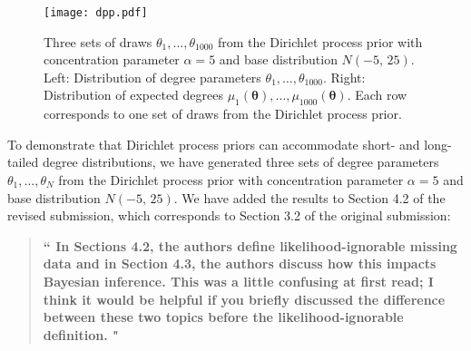 \documentclass[12pt]{article}
\renewcommand{\btheta}{\bm{\theta}}
\renewcommand{\=}{&=&}
\renewcommand{\bbq}{\vspace{.05cm}\begin{quote}\bf``}
\renewcommand{\ebq}{\hspace{-.15cm}"\end{quote}}
\newcommand{\bauthq}{\vspace{.05cm}\begin{quote}\em}
\newcommand{\eauthq}{\hspace{-.25cm}\end{quote}}
\renewcommand{\=}{&=&}
\begin{document}
\setcounter{figure}{1}
\begin{figure}[ht]
\caption{\label{dpp.plot}
Three sets of draws $\theta_1, \dots, \theta_{1000}$ from the Dirichlet process prior with concentration parameter $\alpha=5$ and base distribution $N(-5,\, 25)$.
Left: Distribution of degree parameters $\theta_1, \dots, \theta_{1000}$.
Right: Distribution of expected degrees $\mu_1(\btheta), \dots, \mu_{1000}(\btheta)$.
Each row corresponds to one set of draws from the Dirichlet process prior.}
\begin{center}
\texttt{[image: dpp.pdf]}
\end{center}
\end{figure}
To demonstrate that Dirichlet process priors can accommodate short- and long-tailed degree distributions,
we have generated three sets of degree parameters $\theta_1, \dots, \theta_N$ from the Dirichlet process prior with concentration parameter $\alpha=5$ and base distribution $N(-5,\, 25)$.
We have added the results to Section 4.2 of the revised submission,
which corresponds to Section 3.2 of the original submission:
\bauthq\eauthq

\vspace{-.25cm}

\bbq
In Sections 4.2, the authors define likelihood-ignorable missing data and in Section 4.3, the authors discuss how this impacts Bayesian inference. This was a little confusing at first read; I think it would be helpful if you briefly discussed the difference between these two topics before the likelihood-ignorable definition.
\ebq
\end{document}

